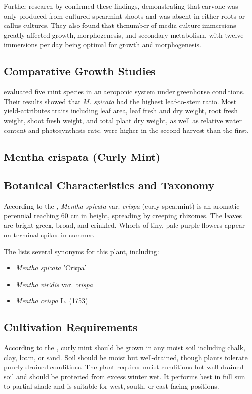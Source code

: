 Further research by \textcite{tisserat2008growth} confirmed these findings, demonstrating that carvone was only produced from cultured spearmint shoots and was absent in either roots or callus cultures. They also found that thenumber of media culture immersions greatly affected growth, morphogenesis, and secondary metabolism, with twelve immersions per day being optimal for growth and morphogenesis.

\subsection*{Comparative Growth Studies}
\textcite{yaghobvand2022evaluation} evaluated five mint species in an aeroponic system under greenhouse conditions. Their results showed that \textit{M. spicata} had the highest leaf-to-stem ratio. Most yield-attributes traits including leaf area, leaf fresh and dry weight, root fresh weight, shoot fresh weight, and total plant dry weight, as well as relative water content and photosynthesis rate, were higher in the second harvest than the first.

\subsection{Mentha crispata (Curly Mint)}

\subsection*{Botanical Characteristics and Taxonomy}
According to the \textcite{rhs2026crispa}, \textit{Mentha spicata} var. \textit{crispa} (curly spearmint) is an aromatic perennial reaching 60 cm in height, spreading by creeping rhizomes. The leaves are bright green, broad, and crinkled. Whorls of tiny, pale purple flowers appear on terminal spikes in summer.

The \textcite{rhs2026crispa} lists several synonyms for this plant, including:
\begin{itemize}
    \item \textit{Mentha spicata} 'Crispa'
    \item \textit{Mentha viridis} var. \textit{crispa}
    \item \textit{Mentha crispa} L. (1753)
\end{itemize}

\subsection*{Cultivation Requirements}
According to the \textcite{rhs2026crispa}, curly mint should be grown in any moist soil including chalk, clay, loam, or sand. Soil should be moist but well-drained, though plants tolerate poorly-drained conditions. The plant requires moist conditions but well-drained soil and should be protected from excess winter wet. It performs best in full sun to partial shade and is suitable for west, south, or east-facing positions.

